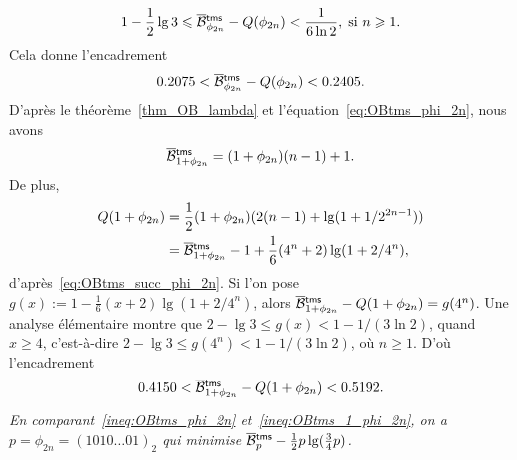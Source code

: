 \begin{itemize}
    \begin{equation*}
      1 - \frac{1}{2}\lg 3 \leqslant
    \OB{\fun{tms}}{\phi_{2n}} - Q(\phi_{2n}) < \frac{1}{6\ln 2},\; \text{si \(n
      \geqslant 1\)}.
    \end{equation*}
    Cela donne l'encadrement
    \begin{equation}
      0.2075 < \OB{\fun{tms}}{\phi_{2n}} - Q(\phi_{2n}) < 0.2405.
      \label{ineq:OBtms_phi_2n}
    \end{equation}
    D'après le théorème~\ref{thm_OB_lambda} et
    l'équation~\eqref{eq:OBtms_phi_2n}, nous avons
    \begin{equation}
      \OB{\fun{tms}}{1+\phi_{2n}} = (1+\phi_{2n})(n-1) + 1.
      \label{eq:OBtms_succ_phi_2n}
    \end{equation}
    De plus,
    \begin{align*}
      Q(1+\phi_{2n}) &= \frac{1}{2}(1+\phi_{2n}) (2(n-1) + \lg(1+1/2^{2n-1}))\\
                    &= \OB{\fun{tms}}{1+\phi_{2n}} - 1 +
      \frac{1}{6}(4^n + 2)\lg(1+2/4^n),
    \end{align*}
    d'après~\eqref{eq:OBtms_succ_phi_2n}. Si l'on pose \(g(x) := 1 -
    \tfrac{1}{6}(x+2)\lg(1+2/4^n)\), alors
    \(\OB{\fun{tms}}{1+\phi_{2n}} - Q(1+\phi_{2n}) = g(4^n)\). Une
    analyse élémentaire montre que \(2 - \lg 3 \leqslant g(x) < 1 -
    1/(3\ln 2)\), quand \(x \geqslant 4\), c'est-à-dire \(2 - \lg 3
    \leqslant g(4^n) < 1 - 1/(3\ln 2)\), où \(n \geqslant 1\). D'où
    l'encadrement
    \begin{equation}
      0.4150 < \smash{\OB{\fun{tms}}{1+\phi_{2n}}} - Q(1+\phi_{2n}) <
      0.5192.
      \label{ineq:OBtms_1_phi_2n}
    \end{equation}

    \bigskip
    \noindent \textsl{En comparant~\eqref{ineq:OBtms_phi_2n}
      et~\eqref{ineq:OBtms_1_phi_2n}, on a \(p=\phi_{2n} =
      (1010\dots01)_2\) qui minimise \(\OB{\fun{tms}}{p} -
      \tfrac{1}{2}p\lg(\tfrac{3}{4}p)\).}
  \bigskip


\end{itemize}
